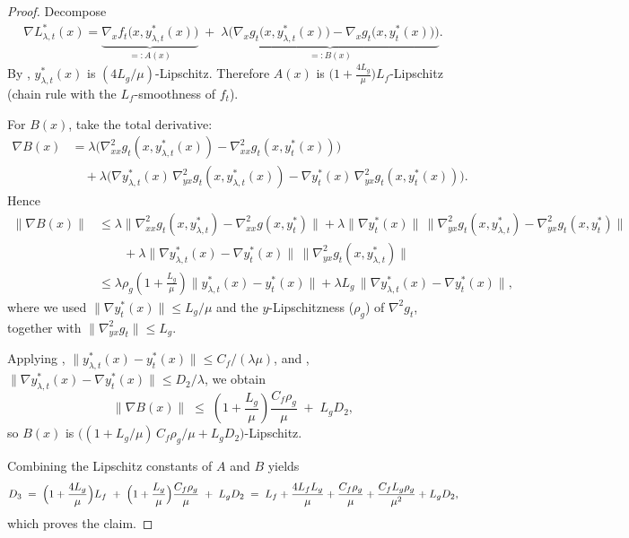 \documentclass{uai2026} %
\begin{document}
\begin{proof}
Decompose
\begin{align}
    \nabla L^*_{\lambda,t}(x)
= \underbrace{\nabla_x f_{t}\bigl(x,y^*_{\lambda,t}(x)\bigr)}_{=:A(x)}
\;+\;
\underbrace{\lambda\bigl(\nabla_x g_{t}\bigl(x,y^*_{\lambda,t}(x)\bigr)-\nabla_x g_{t}\bigl(x,y^*_{t}(x)\bigr)\bigr)}_{=:B(x)}.
\end{align}
By , $y^*_{\lambda,t}(x)$ is $(4L_g/\mu)$-Lipschitz. Therefore $A(x)$ is
$\bigl(1+\tfrac{4L_g}{\mu}\bigr)L_f$-Lipschitz (chain rule with the $L_f$-smoothness of $f_{t}$).

For $B(x)$, take the total derivative:
\begin{align}
    \nabla B(x)
&= \lambda\bigl(\nabla^2_{xx} g_{t}(x,y^*_{\lambda,t}(x))-\nabla^2_{xx} g_{t}(x,y^*_{t}(x))\bigr) \\
&\quad + \lambda\bigl(\nabla y^*_{\lambda,t}(x)\,\nabla^2_{yx} g_{t}(x,y^*_{\lambda,t}(x)) - \nabla y^*_{t}(x)\,\nabla^2_{yx} g_{t}(x,y^*_{t}(x))\bigr).
\end{align}
Hence
\begin{align}
    \|\nabla B(x)\|
&\le \lambda\|\nabla^2_{xx}g_{t}(x,y^*_{\lambda,t})-\nabla^2_{xx}g(x,y^*_{t})\|
 + \lambda\|\nabla y^*_{t}(x)\|\,\|\nabla^2_{yx}g_{t}(x,y^*_{\lambda,t})-\nabla^2_{yx}g_{t}(x,y^*_{t})\| \\
&\qquad + \lambda\|\nabla y^*_{\lambda,t}(x)-\nabla y^*_{t}(x)\|\,\|\nabla^2_{yx}g_{t}(x,y^*_{\lambda,t})\| \\
&\le \lambda\rho_g\!\left(1+\frac{L_g}{\mu}\right)\!\|y^*_{\lambda,t}(x)-y^*_{t}(x)\|
      + \lambda L_g\,\|\nabla y^*_{\lambda,t}(x)-\nabla y^*_{t}(x)\|, 
\end{align}
where we used $\|\nabla y^*_{t}(x)\|\le L_g/\mu$ and the $y$-Lipschitzness ($\rho_g$) of
$\nabla^2 g_{t}$, together with $\|\nabla^2_{yx}g_{t}\|\le L_g$.

Applying , $\|y^*_{\lambda,t}(x)-y^*_{t}(x)\|\le C_f/(\lambda\mu)$, and ,
$\|\nabla y^*_{\lambda,t}(x)-\nabla y^*_{t}(x)\|\le D_2/\lambda$, we obtain
\[
\|\nabla B(x)\| \;\le\; \left(1+\frac{L_g}{\mu}\right)\frac{C_f\rho_g}{\mu} \;+\; L_g D_2,
\]
so $B(x)$ is $\bigl( (1+L_g/\mu)\,C_f\rho_g/\mu + L_g D_2 \bigr)$-Lipschitz. 

Combining the Lipschitz constants of $A$ and $B$ yields
\[
D_3 \;=\; \Bigl(1+\frac{4L_g}{\mu}\Bigr)L_f
\;+\; \Bigl(1+\frac{L_g}{\mu}\Bigr)\frac{C_f\rho_g}{\mu} \;+\; L_g D_2
\;=\; L_f + \frac{4L_fL_g}{\mu} + \frac{C_f\rho_g}{\mu} + \frac{C_f L_g \rho_g}{\mu^2} + L_g D_2,
\]
which proves the claim.
\end{proof}
\end{document}

